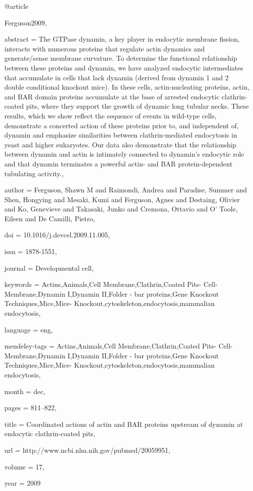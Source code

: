 @article{Ferguson2009,

abstract = {The GTPase dynamin, a key player in endocytic membrane fission, interacts with numerous proteins that regulate actin dynamics and generate/sense membrane curvature. To determine the functional relationship between these proteins and dynamin, we have analyzed endocytic intermediates that accumulate in cells that lack dynamin (derived from dynamin 1 and 2 double conditional knockout mice). In these cells, actin-nucleating proteins, actin, and BAR domain proteins accumulate at the base of arrested endocytic clathrin-coated pits, where they support the growth of dynamic long tubular necks. These results, which we show reflect the sequence of events in wild-type cells, demonstrate a concerted action of these proteins prior to, and independent of, dynamin and emphasize similarities between clathrin-mediated endocytosis in yeast and higher eukaryotes. Our data also demonstrate that the relationship between dynamin and actin is intimately connected to dynamin's endocytic role and that dynamin terminates a powerful actin- and BAR protein-dependent tubulating activity.},

author = {Ferguson, Shawn M and Raimondi, Andrea and Paradise, Summer and Shen, Hongying and Mesaki, Kumi and Ferguson, Agnes and Destaing, Olivier and Ko, Genevieve and Takasaki, Junko and Cremona, Ottavio and {O' Toole}, Eileen and {De Camilli}, Pietro},

doi = {10.1016/j.devcel.2009.11.005},

issn = {1878-1551},

journal = {Developmental cell},

keywords = {Actins,Animals,Cell Membrane,Clathrin,Coated Pits- Cell-Membrane,Dynamin I,Dynamin II,Folder - bar proteins,Gene Knockout Techniques,Mice,Mice- Knockout,cytoskeleton,endocytosis,mammalian endocytosis},

language = {eng},

mendeley-tags = {Actins,Animals,Cell Membrane,Clathrin,Coated Pits- Cell-Membrane,Dynamin I,Dynamin II,Folder - bar proteins,Gene Knockout Techniques,Mice,Mice- Knockout,cytoskeleton,endocytosis,mammalian endocytosis},

month = {dec},

pages = {811--822},

title = {{Coordinated actions of actin and BAR proteins upstream of dynamin at endocytic clathrin-coated pits}},

url = {http://www.ncbi.nlm.nih.gov/pubmed/20059951},

volume = {17},

year = {2009}

}

